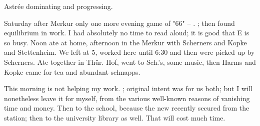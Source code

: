 
Astrée dominating and progressing.

Saturday after Merkur only one more evening game of "66" -- . ; then found equilibrium in work. I had absolutely no time to read aloud; it is good that E is so busy. Noon ate at home, afternoon in the Merkur with Scherners and Kopke and Stettenheim. We left at 5, worked here until 6:30 and then were picked up by Scherners. Ate together in Thür. Hof, went to Sch.'s, some music, then Harms and Kopke came for tea and abundant schnapps.

This morning is not helping my work. ; original intent was for us both; but I will nonetheless leave it for myself, from the various well-known reasons of vanishing time and money. Then to the school, because the new  recently secured from the station; then to the university library as well. That will cost much time.
